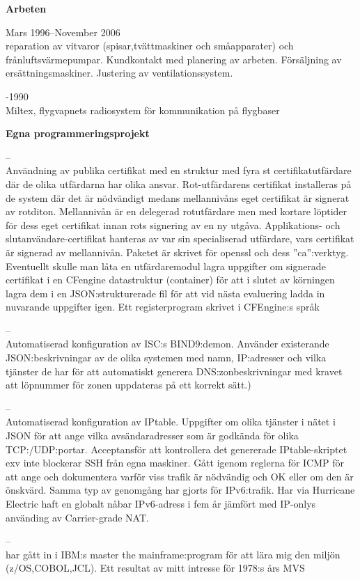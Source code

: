 \documentclass[a4paper,swedish,10pt]{article}
\newenvironment*{descriptioncv}[1]%
{%
  \textbf{\large #1}%
  \begin{description}[nosep,font=\sffamily\bfseries, leftmargin=0.5cm, style=nextline]%
  }%
  {\end{description}\vspace{0.4cm}}
\newcommand*{\cvitem}[3]{\item[#1]{\cinzel#2}\\#3}
\begin{document}
\begin{minipage}[t]{0.73\textwidth}
  \begin{descriptioncv}{Arbeten}
    \cvitem{Servicetekniker, Kronbergs hushållsservice, Skövde}{Mars 1996--November 2006}{reparation av
      vitvaror (spisar,tvättmaskiner och småapparater) och frånluftsvärmepumpar.
      Kundkontakt med planering av arbeten. Försäljning av ersättningsmaskiner. Justering
      av ventilationssystem.}
    \cvitem{Telefonist, F6 Karlsborg}{1989-1990}{Miltex, flygvapnets radiosystem för kommunikation på flygbaser}
  \end{descriptioncv}

  \begin{descriptioncv}{Egna programmeringsprojekt}
    \cvitem{PKI:funktionalitet}{2014--}{Användning av publika certifikat med en struktur med fyra st
      certifikatutfärdare där de olika utfärdarna har olika ansvar. Rot-utfärdarens certifikat
      installeras på de system där det är nödvändigt medans mellannivåns eget certifikat
      är signerat av rotditon. Mellannivån är en delegerad rotutfärdare men med kortare löptider
      för dess eget certifikat innan rots signering av en ny utgåva. Applikations- och slutanvändare-certifikat
      hanteras av var sin specialiserad utfärdare, vars certifikat är signerad av mellannivån. Paketet är skrivet för
      openssl och dess ''ca'':verktyg.
      Eventuellt skulle man låta en utfärdaremodul lagra uppgifter om signerade certifikat i
      en CFengine datastruktur (container) för att i slutet av körningen lagra dem i en JSON:strukturerade fil för att vid
      nästa evaluering ladda in nuvarande uppgifter igen. Ett registerprogram skrivet i CFEngine:s språk }

    \cvitem{Automatisering av BIND}{2015--}{Automatiserad konfiguration av ISC:s BIND9:demon.
      Använder existerande JSON:beskrivningar av
      de olika systemen med namn, IP:adresser och vilka tjänster de har för att automatiskt generera DNS:zonbeskrivningar
      med kravet att löpnummer för zonen uppdateras på ett korrekt sätt.)}

    \cvitem{Automatisering av brandväggsregler}{2015--}{Automatiserad konfiguration av IPtable. Uppgifter om olika tjänster
      i nätet i JSON för att ange vilka avsändaradresser som är godkända för olika TCP:/UDP:portar. Acceptansför att
      kontrollera det genererade IPtable-skriptet exv inte blockerar SSH från egna maskiner. Gått igenom
      reglerna för ICMP för att ange och dokumentera varför viss trafik är nödvändig och OK eller om den är önskvärd.
      Samma typ av genomgång har gjorts för IPv6:trafik. Har via Hurricane Electric haft en globalt nåbar IPv6-adress
      i fem år jämfört med IP-onlys använding av Carrier-grade NAT.}

    \cvitem{IBM:s master the mainframe:program}{2021--}{har gått in i IBM:s master the mainframe:program
      för att lära mig den miljön (z/OS,COBOL,JCL). Ett resultat av mitt intresse för 1978:s års MVS}
  \end{descriptioncv}
\end{minipage}
\end{document}
